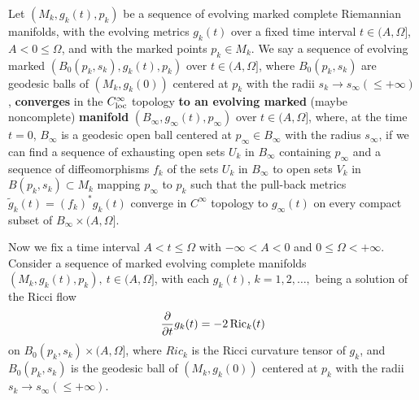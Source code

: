 \begin{definition}
  \label{def:cz-pointed-convergence-of-evolving-manifolds}
Let $(M_k,g_k(t),p_k)$ be a sequence of evolving marked complete
Riemannian manifolds, with the evolving metrics $g_k(t)$ over a
fixed time interval $t\in(A,\Omega]$, $A < 0 \leq \Omega$, and
with the marked points $p_k\in M_k$. We say a sequence of evolving
marked $(B_0(p_k,s_k),g_k(t),p_k)$ over $t \in (A,\Omega]$, where
$B_0(p_k,s_k)$ are geodesic balls of $(M_k,g_k(0))$ centered at
$p_k$ with the radii $s_k \rightarrow s_{\infty}(\leq +\infty)$,
{\bf converges} in the $C_{\rm loc}^{\infty}$ topology {\bf to an
evolving marked} (maybe noncomplete) {\bf
manifold}
$(B_{\infty},g_{\infty}(t),p_{\infty})$ over $t\in(A,\Omega]$,
where, at the time $t=0$, $B_{\infty}$ is a geodesic open ball
centered at $p_{\infty}\in B_{\infty}$ with the radius
$s_{\infty}$, if we can find a sequence of exhausting open sets
$U_k$ in $B_{\infty}$ containing $p_{\infty}$ and a sequence of
diffeomorphisms $f_k$ of the sets $U_k$ in $B_{\infty}$ to open
sets $V_k$ in $B(p_k,s_k) \subset M_k$ mapping $p_{\infty}$ to
$p_k$ such that the pull-back metrics
$\tilde{g}_k(t)=(f_k)^*g_k(t)$ converge in $C^\infty$ topology to
$g_{\infty}(t)$ on every compact subset of
$B_{\infty}\times(A,\Omega]$.
\end{definition}

Now we fix a time interval $A<t \leq \Omega$ with $-\infty < A<0$
and $0 \leq \Omega <+\infty$. Consider a sequence of marked
evolving complete manifolds $(M_k,g_k(t),p_k),\ t\in(A,\Omega]$,
with each $g_k(t)$, $k=1, 2, \ldots,$ being a solution of the
Ricci flow
$$
\frac{\partial}{\partial t}g_k(t)=-2\operatorname{Ric}_k(t)
$$
on $B_0(p_k,s_k) \times (A,\Omega]$, where $Ric_k$ is the Ricci
curvature tensor of $g_k$, and  $B_0(p_k,s_k)$ is the geodesic
ball of $(M_k,g_k(0))$ centered at $p_k$ with the radii $s_k
\rightarrow s_{\infty}(\leq +\infty)$.

